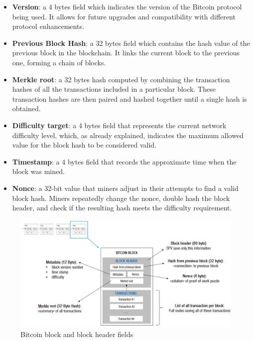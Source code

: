 \begin{itemize}
    \item \textbf{Version}: a 4 bytes field which indicates the version of the Bitcoin protocol being used. It allows for future upgrades and compatibility with different protocol enhancements.
    \item \textbf{Previous Block Hash}: a 32 bytes field  which contains the hash value of the previous block in the blockchain. It links the current block to the previous one, forming a chain of blocks.
    \item \textbf{Merkle root}: a 32 bytes hash computed by combining the transaction hashes of all the transactions included in a particular block. These transaction hashes are then paired and hashed together until a single hash is obtained.
    \item \textbf{Difficulty target}: a 4 bytes field that represents the current network difficulty level, which, as already explained, indicates the maximum allowed value for the block hash to be considered valid.
    \item \textbf{Timestamp}: a 4 bytes field that records the approximate time when the block was mined. 
    \item \textbf{Nonce}: a 32-bit value that miners adjust in their attempts to find a valid block hash. Miners repeatedly change the nonce, double hash the block header, and check if the resulting hash meets the difficulty requirement.
\end{itemize}
\begin{figure}[h!]
\centering
\includegraphics[width=15cm]{Figures/mining/bitcoin-block-header.jpeg}
\caption{Bitcoin block and block header fields}
\label{fig:block_header_fields}
\end{figure}


